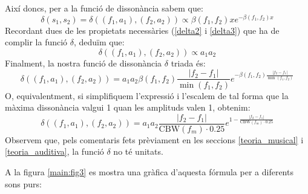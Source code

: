 \documentclass{article}
\theoremstyle{math}
\theoremstyle{TheoremNum}
\newcommand{\0}{\ensuremath{\vb{0}}}
\begin{document}
Així doncs, per a la funció de dissonància sabem que: $$\delta(s_1,s_2)=\delta((f_1,a_1),(f_2,a_2))\propto\beta(f_1,f_2)xe^{-\beta(f_1,f_2)x}$$ Recordant dues de les propietats necessàries (\ref{delta2} i \ref{delta3}) que ha de complir la funció $\delta$, deduïm que: $$\delta((f_1,a_1),(f_2,a_2))\propto a_1a_2$$ Finalment, la nostra funció de dissonància $\delta$ triada és: $$\delta((f_1,a_1),(f_2,a_2))=a_1a_2\beta(f_1,f_2)\frac{|f_2-f_1|}{\min(f_1,f_2)}e^{-\beta(f_1,f_2)\frac{|f_2-f_1|}{\min(f_1,f_2)}}$$
O, equivalentment, si simplifiquem l'expressió i l'escalem de tal forma que la màxima dissonància valgui 1 quan les amplituds valen 1, obtenim: 
\begin{equation}
    \delta((f_1,a_1),(f_2,a_2))=a_1a_2\frac{|f_2-f_1|}{\text{CBW}(f_m)\cdot 0.25}e^{1-\frac{|f_2-f_1|}{\text{CBW}(f_m)\cdot 0.25}}
    \label{for:dissonancia}
\end{equation}
Observem que, pels comentaris fets prèviament en les seccions \ref{teoria_musical} i \ref{teoria_auditiva}, la funció $\delta$ no té unitats.\par\noindent A la figura \ref{main:fig3} es mostra una gràfica d'aquesta fórmula per a diferents sons purs:
\begin{center}
    
    \label{main:fig3}
\end{center}
\end{document}
